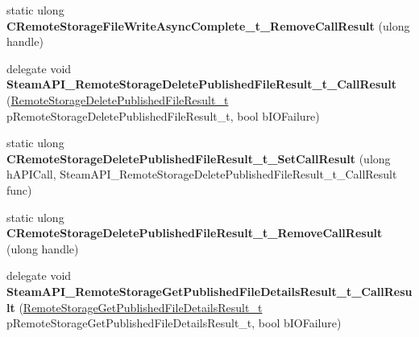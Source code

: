 \begin{DoxyCompactItemize}
\item 
\mbox{\label{class_valve_1_1_interop_1_1_native_entrypoints_a865770cef688860b4184889e171c4d90}} 
static ulong {\bfseries C\+Remote\+Storage\+File\+Write\+Async\+Complete\+\_\+t\+\_\+\+Remove\+Call\+Result} (ulong handle)
\item 
\mbox{\label{class_valve_1_1_interop_1_1_native_entrypoints_ac7c5cb14a27faade3b15acd0ca9f33cd}} 
delegate void {\bfseries Steam\+A\+P\+I\+\_\+\+Remote\+Storage\+Delete\+Published\+File\+Result\+\_\+t\+\_\+\+Call\+Result} (\hyperlink{struct_valve_1_1_steamworks_1_1_remote_storage_delete_published_file_result__t}{Remote\+Storage\+Delete\+Published\+File\+Result\+\_\+t} p\+Remote\+Storage\+Delete\+Published\+File\+Result\+\_\+t, bool b\+I\+O\+Failure)
\item 
\mbox{\label{class_valve_1_1_interop_1_1_native_entrypoints_a0d0b4dbb7cd6cf5bc1ae042d83172a1d}} 
static ulong {\bfseries C\+Remote\+Storage\+Delete\+Published\+File\+Result\+\_\+t\+\_\+\+Set\+Call\+Result} (ulong h\+A\+P\+I\+Call, Steam\+A\+P\+I\+\_\+\+Remote\+Storage\+Delete\+Published\+File\+Result\+\_\+t\+\_\+\+Call\+Result func)
\item 
\mbox{\label{class_valve_1_1_interop_1_1_native_entrypoints_afded03bd7a1274a5b672400bdb097e74}} 
static ulong {\bfseries C\+Remote\+Storage\+Delete\+Published\+File\+Result\+\_\+t\+\_\+\+Remove\+Call\+Result} (ulong handle)
\item 
\mbox{\label{class_valve_1_1_interop_1_1_native_entrypoints_a443ae6d1a16cfd172c6a4c3094ab98d5}} 
delegate void {\bfseries Steam\+A\+P\+I\+\_\+\+Remote\+Storage\+Get\+Published\+File\+Details\+Result\+\_\+t\+\_\+\+Call\+Result} (\hyperlink{struct_valve_1_1_steamworks_1_1_remote_storage_get_published_file_details_result__t}{Remote\+Storage\+Get\+Published\+File\+Details\+Result\+\_\+t} p\+Remote\+Storage\+Get\+Published\+File\+Details\+Result\+\_\+t, bool b\+I\+O\+Failure)
\item 
\mbox{\label{class_valve_1_1_interop_1_1_native_entrypoints_a4c9a323e2d100bbc9311ad6323d70ef0}} 

\end{DoxyCompactItemize}
